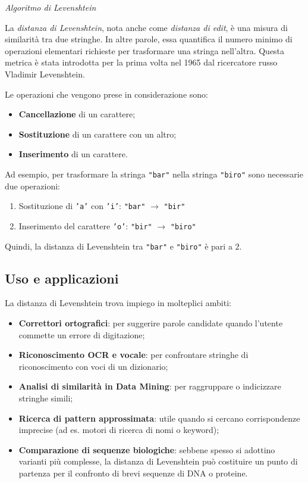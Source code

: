 \documentclass[14pt]{extbook}
\begin{document}
\textit{Algoritmo di Levenshtein}

La \textit{distanza di Levenshtein}, nota anche come \textit{distanza di edit}, è una misura di similarità tra due stringhe. In altre parole, essa quantifica  il numero minimo di operazioni elementari richieste per trasformare una stringa nell'altra. Questa metrica è stata introdotta per la prima volta nel 1965 dal ricercatore russo Vladimir Levenshtein. 

Le operazioni che vengono prese in considerazione sono:
\begin{itemize}
  \item \textbf{Cancellazione} di un carattere;
  \item \textbf{Sostituzione} di un carattere con un altro;
  \item \textbf{Inserimento} di un carattere.
\end{itemize}

Ad esempio, per trasformare la stringa \texttt{"bar"} nella stringa 
\texttt{"biro"} sono necessarie due operazioni:
\begin{enumerate}
  \item Sostituzione di \texttt{'a'} con \texttt{'i'}: 
  \texttt{"bar"} $\rightarrow$ \texttt{"bir"}
  \item Inserimento del carattere \texttt{'o'}: 
  \texttt{"bir"} $\rightarrow$ \texttt{"biro"}
\end{enumerate}
Quindi, la distanza di Levenshtein tra \texttt{"bar"} e \texttt{"biro"} è pari a $2$.

\subsection{Uso e applicazioni}
La distanza di Levenshtein trova impiego in molteplici ambiti:
\begin{itemize}
  \item \textbf{Correttori ortografici}: per suggerire parole candidate 
        quando l'utente commette un errore di digitazione;
  \item \textbf{Riconoscimento OCR e vocale}: per confrontare stringhe 
        di riconoscimento con voci di un dizionario;
  \item \textbf{Analisi di similarità in Data Mining}: per raggruppare 
        o indicizzare stringhe simili;
  \item \textbf{Ricerca di pattern approssimata}: utile quando si cercano 
        corrispondenze imprecise (ad es. motori di ricerca di nomi o keyword);
  \item \textbf{Comparazione di sequenze biologiche}: sebbene spesso si 
        adottino varianti più complesse, la distanza di Levenshtein può 
        costituire un punto di partenza per il confronto di brevi sequenze 
        di DNA o proteine.
\end{itemize}
\end{document}
